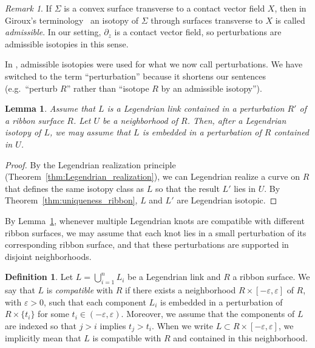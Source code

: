 \documentclass{amsart}
\numberwithin{equation}{section}
\numberwithin{figure}{section}
\newtheorem{lemma}[theorem]{Lemma}
\theoremstyle{definition}
\newtheorem{definition}[theorem]{Definition}
\theoremstyle{remark}
\newtheorem{remark}[theorem]{Remark}
\let\oldSigma\Sigma
\renewcommand{\Sigma}{\oldSigma}
\begin{document}
\begin{remark}
  If $\Sigma$ is a convex surface transverse to a contact vector field $X$, then in Giroux's terminology~\cite{Giroux91} an isotopy of $\Sigma$ through surfaces transverse to $X$ is called \emph{admissible}. In our setting, $\partial_z$ is a contact vector field, so perturbations are admissible isotopies in this sense.

  In \cite{StenhedeAlgorithm}, admissible isotopies were used for what we now call perturbations. We have switched to the term ``perturbation'' because it shortens our sentences (e.g.\ ``perturb $R$'' rather than ``isotope $R$ by an admissible isotopy'').
\end{remark}

\begin{lemma}\label{lem:perturbation}
  Assume that $L$ is a Legendrian link contained in a perturbation $R'$ of a ribbon surface $R$. Let $U$ be a neighborhood of $R$. Then, after a Legendrian isotopy of $L$, we may assume that $L$ is embedded in a perturbation of $R$ contained in $U$.
\end{lemma}

\begin{proof}
  By the Legendrian realization principle (Theorem~\ref{thm:Legendrian_realization}), we can Legendrian realize a curve on $R$ that defines the same isotopy class as $L$ so that the result $L'$ lies in $U$. By Theorem~\ref{thm:uniqueness_ribbon}, $L$ and $L'$ are Legendrian isotopic.
\end{proof}

By Lemma~\ref{lem:perturbation}, whenever multiple Legendrian knots are compatible with different ribbon surfaces, we may assume that each knot lies in a small perturbation of its corresponding ribbon surface, and that these perturbations are supported in disjoint neighborhoods.

\begin{definition}
  Let $L=\bigcup_{i=1}^n L_i$ be a Legendrian link and $R$ a ribbon surface. We say that $L$ is \emph{compatible} with $R$ if there exists a neighborhood $R\times[-\varepsilon,\varepsilon]$ of $R$, with $\varepsilon>0$, such that each component $L_i$ is embedded in a perturbation of $R\times\{t_i\}$ for some $t_i\in(-\varepsilon,\varepsilon)$. Moreover, we assume that the components of $L$ are indexed so that $j>i$ implies $t_j>t_i$.
  When we write $L\subset R\times[-\varepsilon,\varepsilon]$, we implicitly mean that $L$ is compatible with $R$ and contained in this neighborhood.
\end{definition}
\end{document}
